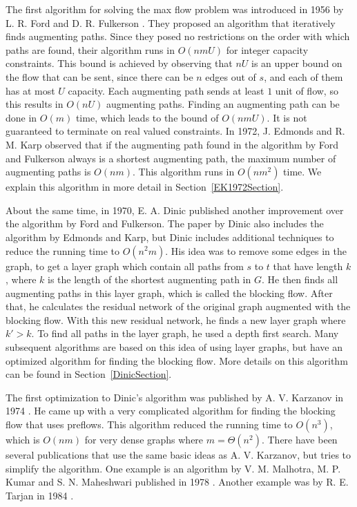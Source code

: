 The first algorithm for solving the max flow problem was introduced in 1956 by L. R. Ford and D. R. Fulkerson \cite{FordFulkerson}. 
They proposed an algorithm that iteratively finds augmenting paths. 
Since they posed no restrictions on the order with which paths are found, their algorithm runs in $O(nmU)$ for integer capacity constraints.
This bound is achieved by observing that $nU$ is an upper bound on the flow that can be sent, since there can be $n$ edges out of $s$, and each of them has at most $U$ capacity.
Each augmenting path sends at least $1$ unit of flow, so this results in $O(nU)$ augmenting paths. Finding an augmenting path can be done in $O(m)$ time, which leads to the bound of $O(nmU)$. 
It is not guaranteed to terminate on real valued constraints.
In 1972, J. Edmonds and R. M. Karp \cite{Edmonds1972} observed that if the augmenting path found in the algorithm by Ford and Fulkerson always is a shortest augmenting path, the maximum number of augmenting paths is $O(nm)$.
This algorithm runs in $O(nm^2)$ time. We explain this algorithm in more detail in Section~\ref{EK1972Section}.

About the same time, in 1970, E. A. Dinic \cite{dinic1970} published another improvement over the algorithm by Ford and Fulkerson.
The paper by Dinic also includes the algorithm by Edmonds and Karp, but Dinic includes additional techniques to reduce the running time to $O(n^2m)$.
His idea was to remove some edges in the graph, to get a layer graph which contain all paths from $s$ to $t$ that have length $k$, where $k$ is the length of the shortest augmenting path in $G$. 
He then finds all augmenting paths in this layer graph, which is called the blocking flow. 
After that, he calculates the residual network of the original graph augmented with the blocking flow. With this new residual network, he finds a new layer graph where $k'>k$.
To find all paths in the layer graph, he used a depth first search. 
Many subsequent algorithms are based on this idea of using layer graphs, but have an optimized algorithm for finding the blocking flow.
More details on this algorithm can be found in Section~\ref{DinicSection}.

The first optimization to Dinic's algorithm was published by A. V. Karzanov in 1974 \cite{karzanov1974}. He came up with a very complicated algorithm for finding the blocking flow that uses preflows.
This algorithm reduced the running time to $O(n^3)$, which is $O(nm)$ for very dense graphs where $m=\Theta(n^2)$.
There have been several publications that use the same basic ideas as A. V. Karzanov, but tries to simplify the algorithm.
One example is an algorithm by V. M. Malhotra, M. P. Kumar and S. N. Maheshwari published in 1978 \cite{MKM78}. 
Another example was by R. E. Tarjan in 1984 \cite{Tarjan1984}.

